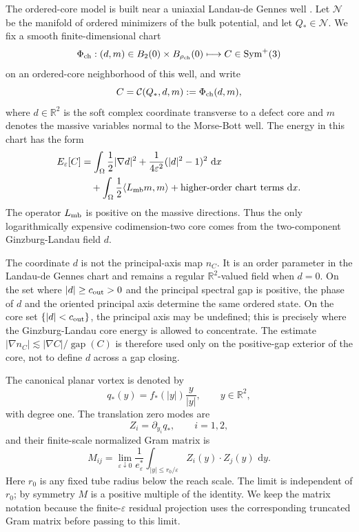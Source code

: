 \documentclass[11pt]{article}
\theoremstyle{definition}
\newcommand{\R}{\mathbb R}
\newcommand{\dd}{\,\mathrm d}
\newcommand{\eps}{\varepsilon}
\newcommand{\estar}{e_\varepsilon^\ast}
\newcommand{\gap}{\operatorname{gap}}
\begin{document}
The ordered-core model is built near a uniaxial Landau-de Gennes well \cite{DeGennesProst,Virga,BallMajumdar,MajumdarZarnescu}.  Let
\(\mathcal N\) be the manifold of ordered minimizers of the bulk potential, and
let \(Q_\ast\in\mathcal N\).  We fix a smooth finite-dimensional chart
\[
        \Phi_{\rm ch}:(d,m)\in B_2(0)\times B_{\rho_{\rm ch}}(0)
        \longmapsto C\in\operatorname{Sym}^+(3)
\]
on an ordered-core neighborhood of this well, and write
\[
        C
        =
        \mathcal C(Q_\ast,d,m):=\Phi_{\rm ch}(d,m),
\]
where \(d\in\R^2\) is the soft complex coordinate transverse to a defect core
and \(m\) denotes the massive variables normal to the Morse-Bott well.  The
energy in this chart has the form
\[
\begin{aligned}
        E_\eps[C]
        &=
        \int_\Omega
        \frac12|\nabla d|^2
        +
        \frac{1}{4\eps^2}(|d|^2-1)^2
        \,\dd x
\\
        &\quad+
        \int_\Omega
        \frac12\langle L_{\rm mb}m,m\rangle
        +\hbox{higher-order chart terms}
        \,\dd x .
\end{aligned}
\]
The operator \(L_{\rm mb}\) is positive on the massive directions.  Thus the
only logarithmically expensive codimension-two core comes from the
two-component Ginzburg-Landau field \(d\).

The coordinate \(d\) is not the principal-axis map \(n_C\).  It is an order
parameter in the Landau-de Gennes chart and remains a regular \(\R^2\)-valued
field when \(d=0\).  On the set where \(|d|\ge c_{\rm out}>0\) and the
principal spectral gap is positive, the phase of \(d\) and the oriented
principal axis determine the same ordered state.  On the core set
\(\{|d|<c_{\rm out}\}\), the principal axis may be undefined; this is precisely
where the Ginzburg-Landau core energy is allowed to concentrate.  The estimate
\(|\nabla n_C|\lesssim |\nabla C|/\gap(C)\) is therefore used only on the
positive-gap exterior of the core, not to define \(d\) across a gap closing.

The canonical planar vortex is denoted by
\[
        q_\ast(y)=f_\ast(|y|)\frac{y}{|y|},
        \qquad y\in\R^2,
\]
with degree one.  The translation zero modes are
\[
        Z_i=\partial_{y_i}q_\ast,\qquad i=1,2,
\]
and their finite-scale normalized Gram matrix is
\[
        M_{ij}
        =
        \lim_{\eps\downarrow0}
        \frac1{\estar}
        \int_{|y|\le r_0/\eps}
        Z_i(y)\cdot Z_j(y)\,\dd y .
\]
Here \(r_0\) is any fixed tube radius below the reach scale.  The limit is
independent of \(r_0\); by symmetry \(M\) is a positive multiple of the
identity.  We keep the matrix notation because the finite-\(\eps\) residual
projection uses the corresponding truncated Gram matrix before passing to this
limit.
\end{document}
